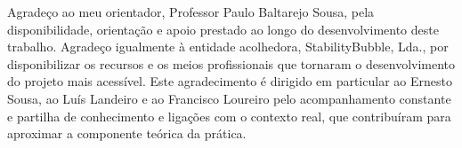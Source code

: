 \begin{acknowledgements}

Agradeço ao meu orientador, Professor Paulo Baltarejo Sousa, pela disponibilidade, orientação e apoio prestado ao longo do desenvolvimento deste trabalho. Agradeço igualmente à entidade acolhedora, StabilityBubble, Lda., por disponibilizar os recursos e os meios profissionais que tornaram o desenvolvimento do projeto mais acessível. Este agradecimento é dirigido em particular ao Ernesto Sousa, ao Luís Landeiro e ao Francisco Loureiro pelo acompanhamento constante e partilha de conhecimento e ligações com o contexto real, que contribuíram para aproximar a componente teórica da prática. 
\end{acknowledgements}


\tableofcontents %

\listoffigures %

\listoftables %



\lstlistoflistings %
\addchaptertocentry{\lstlistlistingname}




%
%
%
%



